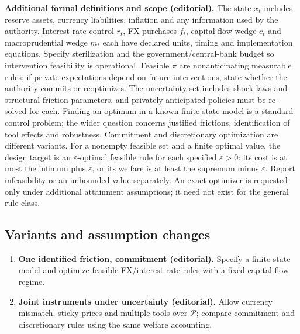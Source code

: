 \documentclass[11pt,a4paper]{article}
\begin{document}
\textbf{Additional formal definitions and scope (editorial).} The state \(x_t\) includes reserve assets, currency liabilities, inflation and any information used by the authority. Interest-rate control \(r_t\), FX purchases \(f_t\), capital-flow wedge \(c_t\) and macroprudential wedge \(m_t\) each have declared units, timing and implementation equations. Specify sterilization and the government/central-bank budget so intervention feasibility is operational. Feasible \(\pi\) are nonanticipating measurable rules; if private expectations depend on future interventions, state whether the authority commits or reoptimizes. The uncertainty set includes shock laws and structural friction parameters, and privately anticipated policies must be re-solved for each. Finding an optimum in a known finite-state model is a standard control problem; the wider question concerns justified frictions, identification of tool effects and robustness. Commitment and discretionary optimization are different variants. For a nonempty feasible set and a finite optimal value, the design target is an \(\varepsilon\)-optimal feasible rule for each specified \(\varepsilon>0\): its cost is at most the infimum plus \(\varepsilon\), or its welfare is at least the supremum minus \(\varepsilon\). Report infeasibility or an unbounded value separately. An exact optimizer is requested only under additional attainment assumptions; it need not exist for the general rule class.
\subsection*{Variants and assumption changes}
\begin{enumerate}
\item \textbf{One identified friction, commitment (editorial).} Specify a finite-state model and optimize feasible FX/interest-rate rules with a fixed capital-flow regime.
\item \textbf{Joint instruments under uncertainty (editorial).} Allow currency mismatch, sticky prices and multiple tools over \(\mathcal P\); compare commitment and discretionary rules using the same welfare accounting.
\end{enumerate}
\end{document}
